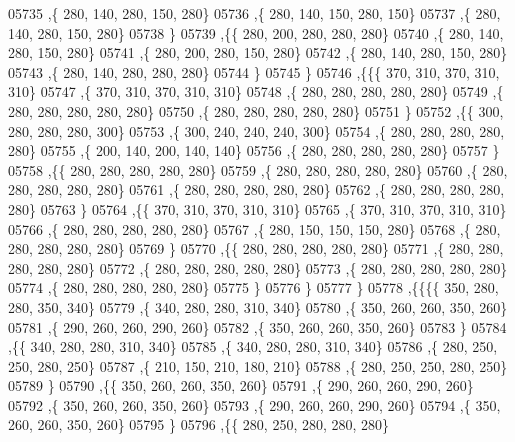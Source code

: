 \begin{DoxyCode}
05735     ,\{   280,   140,   280,   150,   280\}
05736     ,\{   280,   140,   150,   280,   150\}
05737     ,\{   280,   140,   280,   150,   280\}
05738     \}
05739    ,\{\{   280,   200,   280,   280,   280\}
05740     ,\{   280,   140,   280,   150,   280\}
05741     ,\{   280,   200,   280,   150,   280\}
05742     ,\{   280,   140,   280,   150,   280\}
05743     ,\{   280,   140,   280,   280,   280\}
05744     \}
05745    \}
05746   ,\{\{\{   370,   310,   370,   310,   310\}
05747     ,\{   370,   310,   370,   310,   310\}
05748     ,\{   280,   280,   280,   280,   280\}
05749     ,\{   280,   280,   280,   280,   280\}
05750     ,\{   280,   280,   280,   280,   280\}
05751     \}
05752    ,\{\{   300,   280,   280,   280,   300\}
05753     ,\{   300,   240,   240,   240,   300\}
05754     ,\{   280,   280,   280,   280,   280\}
05755     ,\{   200,   140,   200,   140,   140\}
05756     ,\{   280,   280,   280,   280,   280\}
05757     \}
05758    ,\{\{   280,   280,   280,   280,   280\}
05759     ,\{   280,   280,   280,   280,   280\}
05760     ,\{   280,   280,   280,   280,   280\}
05761     ,\{   280,   280,   280,   280,   280\}
05762     ,\{   280,   280,   280,   280,   280\}
05763     \}
05764    ,\{\{   370,   310,   370,   310,   310\}
05765     ,\{   370,   310,   370,   310,   310\}
05766     ,\{   280,   280,   280,   280,   280\}
05767     ,\{   280,   150,   150,   150,   280\}
05768     ,\{   280,   280,   280,   280,   280\}
05769     \}
05770    ,\{\{   280,   280,   280,   280,   280\}
05771     ,\{   280,   280,   280,   280,   280\}
05772     ,\{   280,   280,   280,   280,   280\}
05773     ,\{   280,   280,   280,   280,   280\}
05774     ,\{   280,   280,   280,   280,   280\}
05775     \}
05776    \}
05777   \}
05778  ,\{\{\{\{   350,   280,   280,   350,   340\}
05779     ,\{   340,   280,   280,   310,   340\}
05780     ,\{   350,   260,   260,   350,   260\}
05781     ,\{   290,   260,   260,   290,   260\}
05782     ,\{   350,   260,   260,   350,   260\}
05783     \}
05784    ,\{\{   340,   280,   280,   310,   340\}
05785     ,\{   340,   280,   280,   310,   340\}
05786     ,\{   280,   250,   250,   280,   250\}
05787     ,\{   210,   150,   210,   180,   210\}
05788     ,\{   280,   250,   250,   280,   250\}
05789     \}
05790    ,\{\{   350,   260,   260,   350,   260\}
05791     ,\{   290,   260,   260,   290,   260\}
05792     ,\{   350,   260,   260,   350,   260\}
05793     ,\{   290,   260,   260,   290,   260\}
05794     ,\{   350,   260,   260,   350,   260\}
05795     \}
05796    ,\{\{   280,   250,   280,   280,   280\}

\end{DoxyCode}
